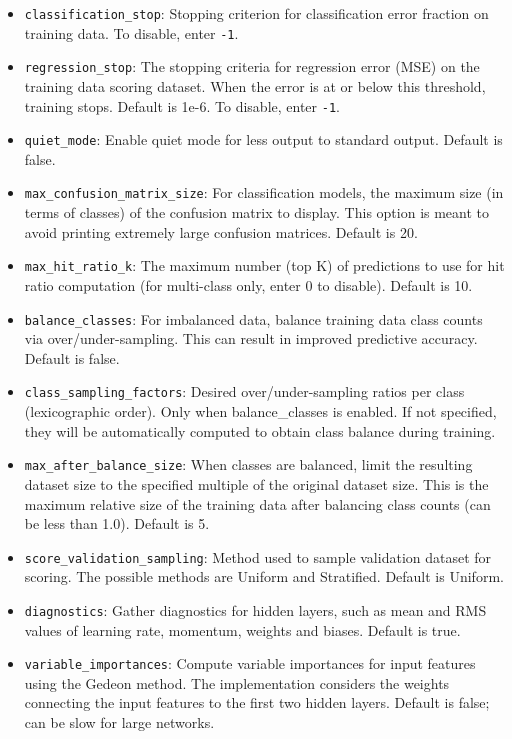\documentclass{article}[11pt]
\begin{document}
\begin{itemize}
\item \texttt{classification\_stop}: Stopping criterion for classification error fraction on training data. To disable, enter \texttt{-1}. 
\item \texttt{regression\_stop}: The stopping criteria for regression error (MSE) on the training data scoring dataset. When the error is at or below this threshold, training stops. Default is 1e-6. To disable, enter \texttt{-1}. 
\item \texttt{quiet\_mode}: Enable quiet mode for less output to standard output. Default is false.
\item \texttt{max\_confusion\_matrix\_size}: For classification models, the maximum size (in terms of classes) of the confusion matrix to display. This option is meant to avoid printing extremely large confusion matrices. Default is 20.
\item \texttt{max\_hit\_ratio\_k}: The maximum number (top K) of predictions to use for hit ratio computation (for multi-class only, enter 0 to disable). Default is 10.
\item \texttt{balance\_classes}: For imbalanced data, balance training data class counts via over/under-sampling. This can result in improved predictive accuracy. Default is false.
\item \texttt{class\_sampling\_factors}: Desired over/under-sampling ratios per class (lexicographic order). Only when balance\_classes is enabled. If not specified, they will be automatically computed to obtain class balance during training.
\item \texttt{max\_after\_balance\_size}: When classes are balanced, limit the resulting dataset size to the specified multiple of the original dataset size. This is the maximum relative size of the training data after balancing class counts (can be less than 1.0). Default is 5.
\item \texttt{score\_validation\_sampling}: Method used to sample validation dataset for scoring. The possible methods are Uniform and Stratified. Default is Uniform.
\item \texttt{diagnostics}: Gather diagnostics for hidden layers, such as mean and RMS values of learning rate, momentum, weights and biases. Default is true.
\item \texttt{variable\_importances}: Compute variable importances for input features using the Gedeon method. The implementation considers the weights connecting the input features to the first two hidden layers. Default is false; can be slow for large networks. 

\end{itemize}
\end{document}

